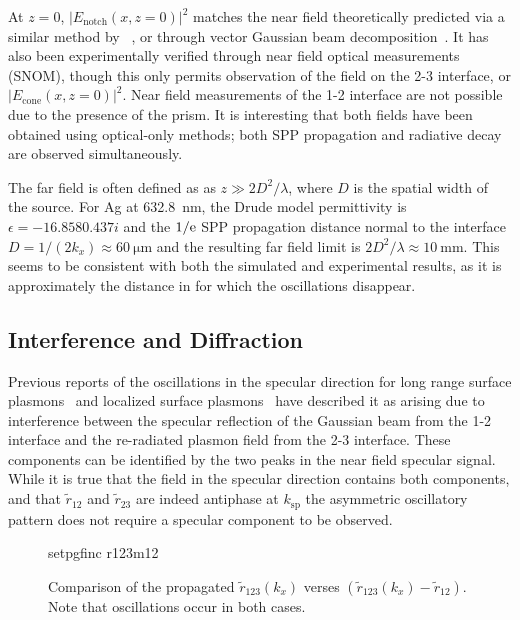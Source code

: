 At $z=0$, $|E_\text{notch}(x,z=0)|^2$ matches the near field theoretically
predicted via a similar method by ~\cite{chuang1986lateral}, or through
vector Gaussian beam decomposition~\cite{baida1999theoretical}.  It has
also been experimentally verified through near field optical measurements
(SNOM), though this only permits observation of the field on the 2-3
interface, or $|E_\text{cone}(x,z=0)|^2$.  Near field measurements of the
1-2 interface are not possible due to the presence of the prism.  It is
interesting that both fields have been obtained using optical-only methods;
both SPP propagation and radiative decay are observed simultaneously.

The far field is often defined as as $z\gg 2 D^2/\lambda$, where $D$ is the
spatial width of the source.  For Ag at \SI{632.8}{\nano\meter}, the Drude
model permittivity is $\epsilon = \num{-16.858+0.437i}$ and the $1/{\mathrm{e}}$ SPP
propagation distance normal to the interface $D = 1/(2 k_x) \approx
\SI{60}{\micro\meter}$ and the resulting far field limit is $2 D^2/\lambda
\approx \SI{10}{\milli\meter}$.  This seems to be consistent with both the
simulated and experimental results, as it is approximately the distance in
 for which the oscillations disappear.

\subsection{Interference and Diffraction}
Previous reports of the oscillations in the specular direction for long
range surface plasmons~\cite{simon2007observation} and localized surface
plasmons~\cite{schumann2008near} have described it as arising due to
interference between the specular reflection of the Gaussian beam from the
1-2 interface and the re-radiated plasmon field from the 2-3 interface.
These components can be identified by the two peaks in the near field
specular signal.  While it is true that the field in the
specular direction contains both components, and that $\tilde{r}_{12}$ and
$\tilde{r}_{23}$ are indeed antiphase at $k_\text{sp}$ the asymmetric 
oscillatory pattern does not require a specular component to be observed.
\begin{figure}[ht]
 \centering
 {setpgfinc}
 {r123m12}
\caption{Comparison of the propagated $\tilde{r}_{123}(k_x)$ verses
$(\tilde{r}_{123}(k_x)-\tilde{r}_{12})$.  Note that oscillations occur in
both cases.  }
\label{fig:r123m12}
\end{figure}

